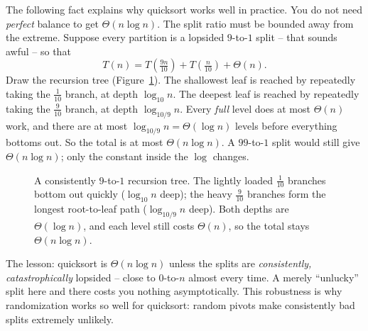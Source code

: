 The following fact explains why quicksort works well in practice. You do not need \emph{perfect}
balance to get $\Theta(n \log n)$. The split ratio must be bounded
away from the extreme. Suppose every partition is a lopsided $9$-to-$1$ split --
that sounds awful -- so that
\[
T(n) = T\!\left(\tfrac{9n}{10}\right) + T\!\left(\tfrac{n}{10}\right) + \Theta(n).
\]
Draw the recursion tree (Figure~\ref{ch07:lopsided-tree}). The shallowest leaf is
reached by repeatedly taking the $\frac{1}{10}$ branch, at depth $\log_{10} n$.
The deepest leaf is reached by repeatedly taking the $\frac{9}{10}$ branch, at
depth $\log_{10/9} n$. Every \emph{full} level does at most $\Theta(n)$ work, and
there are at most $\log_{10/9} n = \Theta(\log n)$ levels before everything
bottoms out. So the total is at most $\Theta(n \log n)$. A $99$-to-$1$ split
would still give $\Theta(n \log n)$; only the constant inside the $\log$ changes.

\begin{figure}[h]
\centering
{}
\caption{A consistently $9$-to-$1$ recursion tree. The lightly loaded
$\frac{1}{10}$ branches bottom out quickly ($\log_{10} n$ deep); the heavy
$\frac{9}{10}$ branches form the longest root-to-leaf path ($\log_{10/9} n$
deep). Both depths are $\Theta(\log n)$, and each level still costs $\Theta(n)$,
so the total stays $\Theta(n\log n)$.}
\label{ch07:lopsided-tree}
\end{figure}

\begin{focusbox}
The lesson: quicksort is $\Theta(n \log n)$ unless the splits are
\emph{consistently, catastrophically} lopsided -- close to $0$-to-$n$ almost
every time. A merely ``unlucky'' split here and there costs you nothing
asymptotically. This robustness is why randomization works so well for
quicksort: random pivots make consistently bad splits extremely unlikely.
\end{focusbox}

